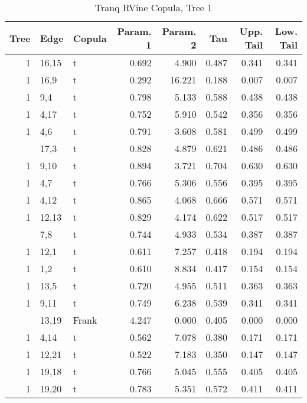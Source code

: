 \begin{table}

\caption{Tranq RVine Copula, Tree 1}
\centering
\begin{tabular}[t]{rllrrrrr}
\toprule
Tree & Edge & Copula & Param. 1 & Param. 2 & Tau & Upp. Tail & Low. Tail\\
\midrule
1 & 16,15 & t & 0.692 & 4.900 & 0.487 & 0.341 & 0.341\\
1 & 16,9 & t & 0.292 & 16.221 & 0.188 & 0.007 & 0.007\\
1 & 9,4 & t & 0.798 & 5.133 & 0.588 & 0.438 & 0.438\\
1 & 4,17 & t & 0.752 & 5.910 & 0.542 & 0.356 & 0.356\\
1 & 4,6 & t & 0.791 & 3.608 & 0.581 & 0.499 & 0.499\\
\addlinespace
1 & 17,3 & t & 0.828 & 4.879 & 0.621 & 0.486 & 0.486\\
1 & 9,10 & t & 0.894 & 3.721 & 0.704 & 0.630 & 0.630\\
1 & 4,7 & t & 0.766 & 5.306 & 0.556 & 0.395 & 0.395\\
1 & 4,12 & t & 0.865 & 4.068 & 0.666 & 0.571 & 0.571\\
1 & 12,13 & t & 0.829 & 4.174 & 0.622 & 0.517 & 0.517\\
\addlinespace
1 & 7,8 & t & 0.744 & 4.933 & 0.534 & 0.387 & 0.387\\
1 & 12,1 & t & 0.611 & 7.257 & 0.418 & 0.194 & 0.194\\
1 & 1,2 & t & 0.610 & 8.834 & 0.417 & 0.154 & 0.154\\
1 & 13,5 & t & 0.720 & 4.955 & 0.511 & 0.363 & 0.363\\
1 & 9,11 & t & 0.749 & 6.238 & 0.539 & 0.341 & 0.341\\
\addlinespace
1 & 13,19 & Frank & 4.247 & 0.000 & 0.405 & 0.000 & 0.000\\
1 & 4,14 & t & 0.562 & 7.078 & 0.380 & 0.171 & 0.171\\
1 & 12,21 & t & 0.522 & 7.183 & 0.350 & 0.147 & 0.147\\
1 & 19,18 & t & 0.766 & 5.045 & 0.555 & 0.405 & 0.405\\
1 & 19,20 & t & 0.783 & 5.351 & 0.572 & 0.411 & 0.411\\
\bottomrule
\end{tabular}
\end{table}
